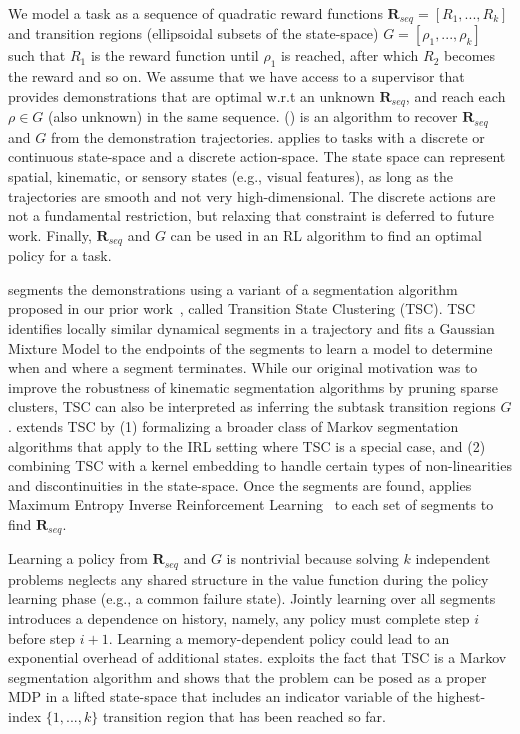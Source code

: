 We model a task as a sequence of quadratic reward functions $\mathbf{R}_{seq}=[R_1,...,R_k]$ and transition regions (ellipsoidal subsets of the state-space) $G = [\rho_1, ...,\rho_k]$ such that $R_1$ is the reward function until $\rho_1$ is reached, after which $R_2$ becomes the reward and so on.
We assume that we have access to a supervisor that provides demonstrations that are optimal w.r.t an unknown $\mathbf{R}_{seq}$, and reach each $\rho \in G$ (also unknown) in the same sequence. 
\hirlfull (\hirl) is an algorithm to recover $\mathbf{R}_{seq}$ and $G$ from the demonstration trajectories.
\hirl applies to tasks with a discrete or continuous state-space and a discrete action-space.
The state space can represent spatial, kinematic, or sensory states (e.g., visual features), as long as the trajectories are smooth and not very high-dimensional.
The discrete actions are not a fundamental restriction, but relaxing that constraint is deferred to future work.
Finally, $\mathbf{R}_{seq}$ and $G$ can be used in an RL algorithm to find an optimal policy for a task.

\hirl segments the demonstrations using a variant of a segmentation algorithm proposed in our prior work~\citep{krishnan2015tsc,murali2016}, called Transition State Clustering (TSC).
TSC identifies locally similar dynamical segments in a trajectory and fits a Gaussian Mixture Model to the endpoints of the segments to learn a model to determine when and where a segment terminates.
While our original motivation was to improve the robustness of kinematic segmentation algorithms by pruning sparse clusters, TSC can also be interpreted as inferring the subtask transition regions $G$.
\hirl extends TSC by (1) formalizing a broader class of Markov segmentation algorithms that apply to the IRL setting where TSC is a special case, and (2) combining TSC with a kernel embedding to handle certain types of non-linearities and discontinuities in the state-space.
Once the segments are found, \hirl applies Maximum Entropy Inverse Reinforcement Learning~\citep{DBLP:conf/aaai/ZiebartMBD08} to each set of segments to find $\mathbf{R}_{seq}$.

Learning a policy from $\mathbf{R}_{seq}$ and $G$ is nontrivial because solving $k$ independent problems neglects any shared structure in the value function during the policy learning phase (e.g., a common failure state).
Jointly learning over all segments introduces a dependence on history, namely, any policy must complete step $i$ before step $i+1$.
Learning a memory-dependent policy could lead to an exponential overhead of additional states. 
\hirl exploits the fact that TSC is a Markov segmentation algorithm and shows that the problem can be posed as a proper MDP in a lifted state-space that includes an indicator variable of the highest-index $\{1,...,k\}$ transition region that has been reached so far.

